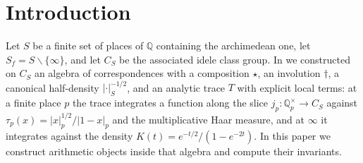 \documentclass[11pt]{amsart}
\theoremstyle{definition}
\theoremstyle{remark}
\newcommand{\Q}{\mathbb Q}
\begin{document}
\maketitle

\tableofcontents

\section{Introduction}

Let $S$ be a finite set of places of $\Q$ containing the archimedean one, let
$S_f=S\smallsetminus\{\infty\}$, and let $C_S$ be the associated idele class
group.  In \cite{Companion} we constructed on $C_S$ an algebra of
correspondences with a composition $\star$, an involution $\dagger$, a
canonical half-density $|\cdot|_S^{-1/2}$, and an analytic trace $T$ with
explicit local terms: at a finite place $p$ the trace integrates a function
along the slice $j_p:\Q_p^\times\to C_S$ against
$\tau_p(x)=|x|_p^{1/2}/|1-x|_p$ and the multiplicative Haar measure, and at
$\infty$ it integrates against the density $K(t)=e^{-t/2}/(1-e^{-2t})$.  In
this paper we construct arithmetic objects inside that algebra and compute
their invariants.
\end{document}
